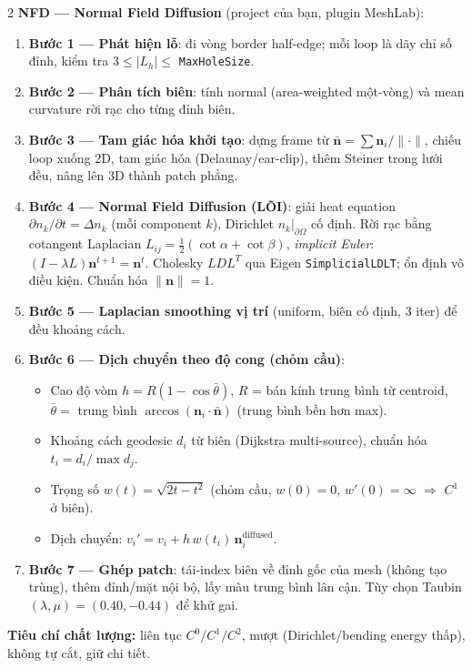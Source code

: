\begin{paracol}{2}
\textbf{NFD — Normal Field Diffusion} (project của bạn, plugin MeshLab):
\begin{enumerate}[leftmargin=*,nosep]
  \item \textbf{Bước 1 — Phát hiện lỗ}: đi vòng border half-edge; mỗi loop là dãy chỉ số đỉnh, kiểm tra $3\le|L_h|\le$ \texttt{MaxHoleSize}.
  \item \textbf{Bước 2 — Phân tích biên}: tính normal (area-weighted một-vòng) và mean curvature rời rạc cho từng đỉnh biên.
  \item \textbf{Bước 3 — Tam giác hóa khởi tạo}: dựng frame từ $\bar{\mathbf n}=\sum\mathbf n_i/\|\cdot\|$, chiếu loop xuống 2D, tam giác hóa (Delaunay/ear-clip), thêm Steiner trong lưới đều, nâng lên 3D thành patch phẳng.
  \item \textbf{Bước 4 — Normal Field Diffusion (LÕI)}: giải heat equation $\partial n_k/\partial t = \Delta n_k$ (mỗi component $k$), Dirichlet $n_k|_{\partial\Omega}$ cố định. Rời rạc bằng cotangent Laplacian $L_{ij}=\tfrac12(\cot\alpha+\cot\beta)$, \emph{implicit Euler}: $(I-\lambda L)\mathbf n^{t+1}=\mathbf n^t$. Cholesky $LDL^T$ qua Eigen \texttt{SimplicialLDLT}; ổn định vô điều kiện. Chuẩn hóa $\|\mathbf n\|=1$.
  \item \textbf{Bước 5 — Laplacian smoothing vị trí} (uniform, biên cố định, 3 iter) để đều khoảng cách.
  \item \textbf{Bước 6 — Dịch chuyển theo độ cong (chỏm cầu)}:
    \begin{itemize}[leftmargin=1em,nosep]
      \item Cao độ vòm $h=R(1-\cos\bar\theta)$, $R$ = bán kính trung bình từ centroid, $\bar\theta=$ trung bình $\arccos(\mathbf n_i\cdot\bar{\mathbf n})$ (trung bình bền hơn max).
      \item Khoảng cách geodesic $d_i$ từ biên (Dijkstra multi-source), chuẩn hóa $t_i=d_i/\max d_j$.
      \item Trọng số $w(t)=\sqrt{2t-t^2}$ (chỏm cầu, $w(0)=0$, $w'(0)=\infty$ $\Rightarrow$ $C^1$ ở biên).
      \item Dịch chuyển: $v_i' = v_i + h\,w(t_i)\,\mathbf n_i^{\text{diffused}}$.
    \end{itemize}
  \item \textbf{Bước 7 — Ghép patch}: tái-index biên về đỉnh gốc của mesh (không tạo trùng), thêm đỉnh/mặt nội bộ, lấy màu trung bình lân cận. Tùy chọn Taubin $(\lambda,\mu)=(0.40,-0.44)$ để khử gai.
\end{enumerate}

\textbf{Tiêu chí chất lượng:} liên tục $C^0/C^1/C^2$, mượt (Dirichlet/bending energy thấp), không tự cắt, giữ chi tiết.


\end{paracol}
